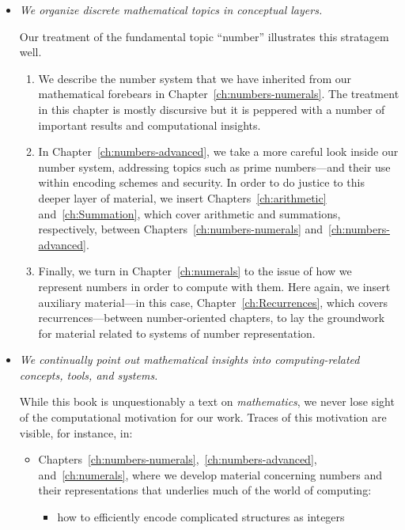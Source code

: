 \begin{itemize}
\item
{\em We organize discrete mathematical topics in conceptual layers.}

\smallskip

Our treatment of the fundamental topic ``number'' illustrates this stratagem well.
  \begin{enumerate}
  \item
We describe the number system that we have inherited from our mathematical forebears in Chapter~\ref{ch:numbers-numerals}.  The treatment in this chapter is mostly discursive but it is peppered with a number of important results and computational insights.
  \item
In Chapter~\ref{ch:numbers-advanced}, we take a more careful look inside our number system, addressing topics such as prime numbers---and their use within encoding schemes and security.  In order to do justice to this deeper layer of material, we insert Chapters~\ref{ch:arithmetic} and~\ref{ch:Summation}, which cover arithmetic and summations, respectively, between
Chapters~\ref{ch:numbers-numerals} and~\ref{ch:numbers-advanced}.
  \item
Finally, we turn in Chapter~\ref{ch:numerals} to the issue of how we represent numbers in order to compute with them.  Here again, we insert auxiliary material---in this case, Chapter~\ref{ch:Recurrences}, which covers recurrences---between number-oriented chapters, to lay the groundwork for material related to systems of number representation.
  \end{enumerate}

\item
{\em We continually point out mathematical insights into {\em computing-related} concepts, tools, and systems.}

\smallskip

While this book is unquestionably a text on {\em mathematics}, we never lose sight of the computational motivation for our work.  Traces of this motivation are visible, for instance, in:
  \begin{itemize}
  \item
Chapters~\ref{ch:numbers-numerals},~\ref{ch:numbers-advanced}, and~\ref{ch:numerals}, where we develop material concerning numbers and their representations that underlies much of the world of computing:
     \begin{itemize}
     \item
how to efficiently encode complicated structures as integers


\end{itemize}
\end{itemize}
\end{itemize}
